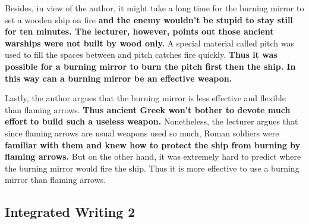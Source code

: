 Besides, in view of the author, it might take a long time for the burning mirror to set a wooden ship on fire \textbf{and the enemy wouldn’t be stupid to stay still for ten minutes. The lecturer, however, points out those ancient warships were not built by wood only.} A special material called pitch was used to fill the spaces between and pitch catches fire quickly. \textbf{Thus it was possible for a burning mirror to burn the pitch first then the ship. In this way can a burning mirror be an effective weapon.}

Lastly, the author argues that the burning mirror is less effective and flexible than flaming arrows. \textbf{Thus ancient Greek won’t bother to devote much effort to build such a useless weapon. }Nonetheless, the lecturer argues that since flaming arrows are usual weapons used so much, Roman soldiers were \textbf{familiar with them and knew how to protect the ship from burning by flaming arrows.} But on the other hand, it was extremely hard to predict where the burning mirror would fire the ship. Thus it is more effective to use a burning mirror than flaming arrows.

\subsection{Integrated Writing 2}

